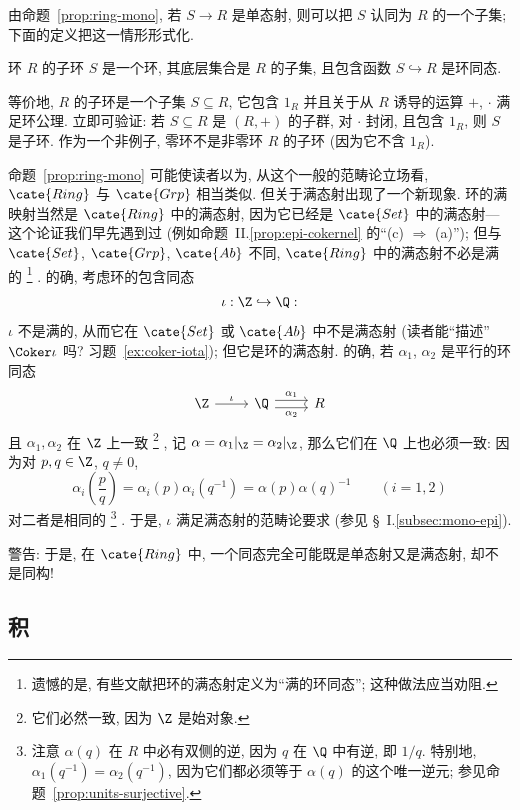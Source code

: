由命题~\ref{prop:ring-mono}, 若 $S \to R$ 是单态射, 则可以把 $S$ 认同为 $R$ 的一个子集; 下面的定义把这一情形形式化.

\begin{definition}
\label{def:subring}
环 $R$ 的子环%
$S$ 是一个环, 其底层集合是 $R$ 的子集, 且包含函数 $S \hookrightarrow R$ 是环同态.
\end{definition}

等价地, $R$ 的子环是一个子集 $S \subseteq R$, 它包含 $1_R$ 并且关于从 $R$ 诱导的运算 $+$, $\cdot$ 满足环公理. 立即可验证: 若 $S \subseteq R$ 是 $(R, +)$ 的子群, 对 $\cdot$ 封闭, 且包含 $1_R$, 则 $S$ 是子环. 作为一个非例子, 零环不是非零环 $R$ 的子环 (因为它不含 $1_R$).

命题~\ref{prop:ring-mono} 可能使读者以为, 从这个一般的范畴论立场看, $\cate{Ring}$ 与 $\cate{Grp}$ 相当类似. 但关于满态射出现了一个新现象. 环的满映射当然是 $\cate{Ring}$ 中的满态射, 因为它已经是 $\cate{Set}$ 中的满态射---这个论证我们早先遇到过 (例如命题~II.\ref{prop:epi-cokernel} 的``(c) $\Longrightarrow$ (a)''); 但与 $\cate{Set}$, $\cate{Grp}$, $\cate{Ab}$ 不同, $\cate{Ring}$ 中的满态射不必是满的%
\footnote{遗憾的是, 有些文献把环的满态射定义为``满的环同态''; 这种做法应当劝阻.}%
. 的确, 考虑环的包含同态
\[
\iota : \Z \hookrightarrow \Q:
\]
$\iota$ 不是满的, 从而它在 $\cate{Set}$ 或 $\cate{Ab}$ 中不是满态射 (读者能``描述''$\Coker \iota$ 吗? 习题~\ref{ex:coker-iota}); 但它是环的满态射. 的确, 若 $\alpha_1$, $\alpha_2$ 是平行的环同态
\[
\begin{tikzcd}
\Z \ar[r,"\iota"] & \Q \ar[r,shift left=.6ex,"\alpha_1"] \ar[r,shift right=.6ex,"\alpha_2"'] & R
\end{tikzcd}
\]
且 $\alpha_1, \alpha_2$ 在 $\Z$ 上一致%
\footnote{它们必然一致, 因为 $\Z$ 是始对象.}%
, 记 $\alpha = \alpha_1|_{\Z} = \alpha_2|_{\Z}$, 那么它们在 $\Q$ 上也必须一致: 因为对 $p, q \in \Z$, $q \neq 0$,
\[
\alpha_i\left(\frac{p}{q}\right) = \alpha_i(p)\alpha_i(q^{-1}) = \alpha(p)\alpha(q)^{-1} \qquad (i = 1, 2)
\]
对二者是相同的%
\footnote{注意 $\alpha(q)$ 在 $R$ 中必有双侧的逆, 因为 $q$ 在 $\Q$ 中有逆, 即 $1/q$. 特别地, $\alpha_1(q^{-1})=\alpha_2(q^{-1})$, 因为它们都必须等于 $\alpha(q)$ 的这个唯一逆元; 参见命题~\ref{prop:units-surjective}.}%
. 于是, $\iota$ 满足满态射的范畴论要求 (参见 \S~I.\ref{subsec:mono-epi}).

警告: 于是, 在 $\cate{Ring}$ 中, 一个同态完全可能既是单态射又是满态射, 却不是同构!

\subsection{积}
\label{subsec:ring-products}

